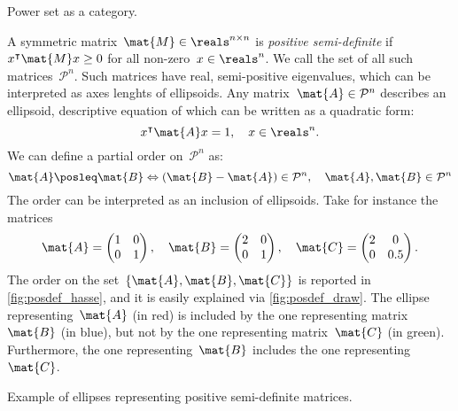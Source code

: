  \begin{marginfigure}
      \begin{center}
      \end{center}
      \caption{Power set as a category.}
      \label{fig:powersetcat}
  \end{marginfigure}

\begin{example}
A symmetric matrix~$\mat{M}\in \reals^{n\times n}$ is \emph{positive semi-definite} if~$x^\intercal \mat{M}x\geq 0$ for all non-zero~$x\in \reals^n$.
We call the set of all such matrices~$\mathcal{P}^n$. Such matrices have real, semi-positive eigenvalues, which can be interpreted as axes lenghts of ellipsoids.
Any matrix~$\mat{A}\in \mathcal{P}^n$ describes an ellipsoid, descriptive equation of which can be written as a quadratic form:
\begin{equation*}
    x^\intercal \mat{A}x=1,\quad x\in \reals^n.
\end{equation*}
We can define a partial order on~$\mathcal{P}^n$ as:
\begin{equation*}
\mat{A}\posleq \mat{B} \Leftrightarrow (\mat{B}-\mat{A})\in \mathcal{P}^n, \quad \mat{A},\mat{B}\in \mathcal{P}^n
\end{equation*}
The order can be interpreted as an inclusion of ellipsoids. Take for instance the matrices
\begin{equation*}
    \mat{A}=\begin{pmatrix}1&0\\0&1\end{pmatrix}, \quad \mat{B}=\begin{pmatrix}2&0\\0&1\end{pmatrix},\quad \mat{C}=\begin{pmatrix}2&0\\0&0.5\end{pmatrix}.
\end{equation*}
The order on the set~$\{\mat{A},\mat{B},\mat{C}\}$ is reported in \cref{fig:posdef_hasse}, and it is easily explained via \cref{fig:posdef_draw}.
The ellipse representing~$\mat{A}$ (in red) is included by the one representing matrix~$\mat{B}$ (in blue), but not by the one representing matrix~$\mat{C}$ (in green).
Furthermore, the one representing~$\mat{B}$ includes the one representing~$\mat{C}$.
\end{example}

\begin{marginfigure}
    \begin{center}
    \end{center}
    \caption{Example of ellipses representing positive semi-definite matrices.}
    \label{fig:posdef_draw}
\end{marginfigure}

